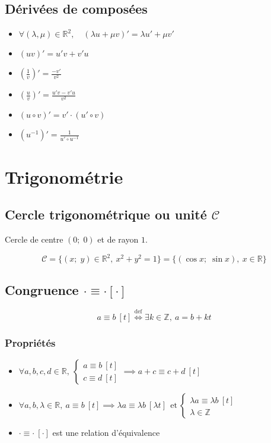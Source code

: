 \documentclass{article}
\newcommand{\R}{{\mathbb R}}
\newcommand{\Z}{{\mathbb Z}}
\newcommand{\et}{\:\text{et}\:}
\newcommand{\point}[2]{(#1;\;#2)}
\renewcommand{\cong}{\equiv}
\begin{document}
\subsection{Dérivées de composées}
\begin{itemize}
	\item $\forall (\lambda, \mu) \in \R^2,\quad (\lambda u + \mu v)' = \lambda u' + \mu v'$
	\item $(uv)' = u'v+v'u$
	\item $(\frac{1}{v})' = \frac{-v'}{v^2}$
	\item $(\frac{u}{v})' = \frac{u'v-v'u}{v^2}$
	\item $(u \circ v)' = v' \cdot  (u' \circ v)$
	\item $(u^{-1})' = \frac{1}{u' \circ u^{-1}}$
\end{itemize}

\section{Trigonométrie}
\subsection{Cercle trigonométrique ou unité $\mathcal C$}

Cercle de centre $\point{0}{0}$ et de rayon $1$.

\[
	\mathcal C = \{ \point{x}{y} \in \R^2,\: x^2 + y^2 = 1 \} = \{ \point{\cos x}{\sin x},\: x \in \R \} 
\] 

\subsection{Congruence $\cdot \cong \cdot [\cdot]$}

\[
	a \cong b\ [t] \stackrel{\text{def}}{\iff} \exists k\in \Z,\ a = b + kt

\] 
\subsubsection{Propriétés}

\begin{itemize}
	\item $\forall a, b, c, d\in \R,\ \begin{cases}
			a \cong b\ [t]\\
			c \cong d\ [t]
		\end{cases} \implies a + c \cong c + d\ [t]$
	\item $\forall a, b, \lambda \in \R,\ a\cong b\ [t] \implies \lambda a \cong \lambda b\ [\lambda t] \ \et \begin{cases}
			\lambda a \cong \lambda b\ [t] \\
			\lambda \in \Z
	\end{cases}$
\item $ \cdot \cong \cdot \ [ \cdot ]$ est une relation d'équivalence
\end{itemize}
\end{document}
